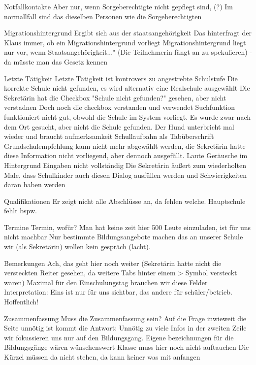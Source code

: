 Notfallkontakte
Aber nur, wenn Sorgeberechtigte nicht gepflegt sind, (?)
Im normallfall sind das dieselben Personen wie die Sorgeberechtigten



















Migrationshintergrund		
Ergibt sich aus der staatsangehörigkeit
Das hinterfragt der Klaus immer, ob ein Migrationshintergrund vorliegt
Migrationshintergrund liegt nur vor, wenn Staatsangehörigkeit..." (Die Teilnehmerin fängt an zu spekulieren) - da müsste man das Gesetz kennen			




Letzte Tätigkeit
Letzte Tätigkeit ist kontrovers zu angestrebte Schulstufe
Die korrekte Schule nicht gefunden, es wird alternativ eine Realschule ausgewählt
Die Sekretärin hat die Checkbox "Schule nicht gefunden?" gesehen, aber nicht verstadnen
Doch noch die checkbox verstanden und verwendet
Suchfunktion funktioniert nicht gut, obwohl die Schule im System vorliegt. Es wurde zwar nach dem Ort gesucht, aber nicht die Schule gefunden.
Der Hund unterbricht mal wieder und braucht aufmerksamkeit
Schullaufbahn als Tabüberschrift
Grundschulempfehlung kann nicht mehr abgewählt werden, die Sekretärin hatte diese Information nicht vorliegend, aber dennoch ausgefüllt. 
Laute Geräusche im Hintergrund
Eingaben nicht vollständig
Die Sekretärin äußert zum wiederholten Male, dass Schulkinder auch diesen Dialog ausfüllen werden und Schwierigkeiten daran haben werden

Qualifikationen
Er zeigt nicht alle Abschlüsse an, da fehlen welche. Hauptschule fehlt bspw.

Termine
Termin, wofür?
Man hat keine zeit hier 500 Leute einzuladen, ist für uns nicht machbar
Nur bestimmte Bildungsangebote machen das an unserer Schule wir (als Sekretärin) wollen kein gespräch (lacht).

Bemerkungen
Ach, das geht hier noch weiter (Sekretärin hatte nicht die versteckten Reiter gesehen, da weitere Tabs hinter einem > Symbol versteckt waren)
Maximal für den Einschulungstag brauchen wir diese Felder
Interpretation: Eins ist nur für uns sichtbar, das andere für schüler/betrieb. Hoffentlich!

Zusammenfassung
Muss die Zusammenfassung sein? 
Auf die Frage inwieweit die Seite unnötig ist kommt die Antwort: Unnötig zu viele Infos in der zweiten Zeile
wir fokussieren uns nur auf den Bildungsgang.
Eigene bezeichnungen für die Bildungsgänge wären wünschenswert
Klasse muss hier noch nicht auftauchen
Die Kürzel müssen da nicht stehen, da kann keiner was mit anfangen


